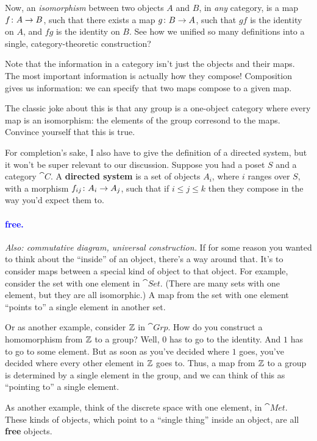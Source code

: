 \documentclass[11pt,paper=letter]{scrartcl}
\renewcommand{\bluebf}[1]{{\bfseries \color{Blue} #1}}
\renewcommand\wp[1]{\paragraph{\textcolor{Blue}{#1.}} \hspace{-1em}}
\newcommand\wl[1]{\label{w:#1}}
\newcommand\oww[1]{\textit{Also: #1.}}
\begin{document}
Now, an \textit{isomorphism} between two objects $A$ and $B$, in \textit{any} category, is a map $f \colon A \to B$, such that there exists a map $g \colon B \to A$, such that $gf$ is the identity on $A$, and $fg$ is the identity on $B$. See how we unified so many definitions into a single, category-theoretic construction?

Note that the information in a category isn't just the objects and their maps. The most important information is actually how they compose! Composition gives us information: we can specify that two maps compose to a given map.

\begin{exrboxed}
  The classic joke about this is that any group is a one-object category where every map is an isomorphism: the elements of the group corresond to the maps. Convince yourself that this is true.
\end{exrboxed}

For completion's sake, I also have to give the definition of a directed system, but it won't be super relevant to our discussion. Suppose you had a poset $S$ and a category $\cat{C}$. A \bluebf{directed system} is a set of objects $A_i$, where $i$ ranges over $S$, with a morphism $f_{ij} \colon A_i \to A_j$, such that if $i \le j \le k$ then they compose in the way you'd expect them to.

\wp{free}
\wl{free}
\oww{commutative diagram, universal construction}
If for some reason you wanted to think about the ``inside'' of an object, there's a way around that. It's to consider maps between a special kind of object to that object. For example, consider the set with one element in $\cat{Set}$. (There are many sets with one element, but they are all isomorphic.) A map from the set with one element ``points to'' a single element in another set.

Or as another example, consider $\mathbb Z$ in $\cat{Grp}$. How do you construct a homomorphism from $\mathbb Z$ to a group? Well, $0$ has to go to the identity. And $1$ has to go to some element. But as soon as you've decided where $1$ goes, you've decided where every other element in $\mathbb Z$ goes to. Thus, a map from $\mathbb Z$ to a group is determined by a single element in the group, and we can think of this as ``pointing to'' a single element.

As another example, think of the discrete space with one element, in $\cat{Met}$. These kinds of objects, which point to a ``single thing'' inside an object, are all \bluebf{free} objects.
\end{document}
